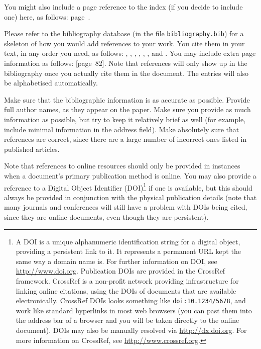 You might also include a page reference to the index (if you decide to include one) here, as follows: page~\pageref{index}.

Please refer to the bibliography database (in the file \texttt{bibliography.bib}) for a skeleton of how you would add references to your work. You cite them in your text, in any order you need, as follows: \cite{ref:Alhoniemi:1999b}, \cite{ref:Alahakoon:2000}, \cite{ref:Oja:2003}, \cite{ref:Alhoniemi:1999a}, \cite{ref:Kaski:1995}, \cite{ref:Fasulo:1999}, \cite{ref:Kaski:1997} and \cite{ref:Aha:1998}. You may include extra page information as follows: \cite{ref:Clark:1989}[page~82]. Note that references will only show up in the bibliography once you actually cite them in the document. The entries will also be alphabetised automatically.

Make sure that the bibliographic information is as accurate as possible. Provide full author names, as they appear on the paper. Make sure you provide as much information as possible, but try to keep it relatively brief as well (for example, include minimal information in the address field). Make absolutely sure that references are correct, since there are a large number of incorrect ones listed in published articles.

Note that references to online resources should only be provided in instances when a document's primary publication method is online. You may also provide a reference to a Digital Object Identifier (DOI)\footnote{A DOI is a unique alphanumeric identification string for a digital object, providing a persistent link to it. It represents a permanent URL kept the same way a domain name is. For further information on DOI, see \url{http://www.doi.org}. Publication DOIs are provided in the CrossRef framework. CrossRef is a non-profit network providing infrastructure for linking online citations, using the DOIs of documents that are available electronically. CrossRef DOIs looks something like \texttt{doi:10.1234/5678}, and work like standard hyperlinks in most web browsers (you can past them into the address bar of a browser and you will be taken directly to the online document). DOIs may also be manually resolved via \url{http://dx.doi.org}. For more information on CrossRef, see \url{http://www.crossref.org}.} if one is available, but this should always be provided in conjunction with the physical publication details (note that many journals and conferences will still have a problem with DOIs being cited, since they are online documents, even though they are persistent).

